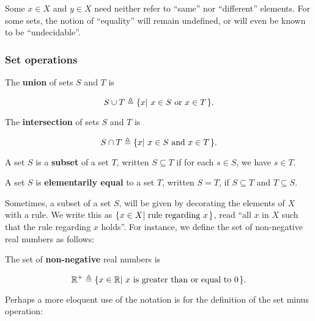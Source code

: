 \begin{remark} Some $x\in X$ and $y\in X$ need neither refer to ``same''
nor ``different'' elements. For some sets, the notion of ``equality'' will
remain undefined, or will even be known to be ``undecidable''. \end{remark}

\subsubsection{Set operations}

\begin{definition} The \textbf{union} of sets $S$ and $T$ is

$$S\cup T\triangleq \mathopen{}\left\{{x\mathopen{}\left|\ {\text{$x\in S$ or $x\in T$}}\right.\mathclose{}}\right\}\mathclose{}.$$

\end{definition}

\begin{definition} The \textbf{intersection} of sets $S$ and $T$ is

$$S\cap T\triangleq \mathopen{}\left\{{x\mathopen{}\left|\ {\text{$x\in S$ and $x\in T$}}\right.\mathclose{}}\right\}\mathclose{}.$$

\end{definition}

\begin{definition} A set $S$ is a \textbf{subset} of a set $T$, written
$S\subseteq T$ if for each $s\in S$, we have $s\in T$. \end{definition}

\begin{definition} A set $S$ is \textbf{elementarily equal} to a set $T$,
written $S=T$, if $S\subseteq T$ and $T\subseteq S$. \end{definition} 

Sometimes, a subset of a set $S$, will be given by decorating the elements of
$X$ with a rule. We write this as $\mathopen{}\left\{{x\in X\mathopen{}\left|\ {\text{rule regarding $x$}}\right.\mathclose{}}\right\}\mathclose{}$,
read ``all $x$ in $X$ such that the rule regarding $x$ holds''. For instance,
we define the set of non-negative real numbers as follows:

\begin{definition} The set of \textbf{non-negative} real numbers is

$$\mathbb{R}^+ \triangleq \mathopen{}\left\{{ x\in\mathbb{R} \mathopen{}\left|\ {\text{$x$ is greater than or
equal to $0$}}\right.\mathclose{}}\right\}\mathclose{}.$$

\end{definition}

Perhaps a more eloquent use of the notation is for the definition of the set
minus operation:

